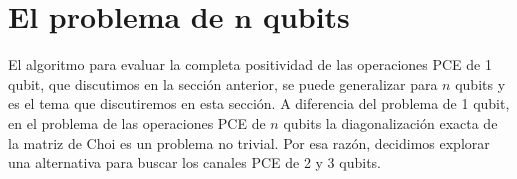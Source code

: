 \section{El problema de $\mathbf{n}$  qubits} %
\label{sec:n_qubits_problem}

%

El algoritmo  para evaluar la completa positividad de las operaciones PCE de 1
qubit, que discutimos en la sección anterior, se puede generalizar para $n$
qubits y es 
el tema que discutiremos en esta sección. A diferencia 
del problema de 1 qubit, en el problema de las operaciones PCE de $n$ qubits
la diagonalización exacta de la matriz de Choi es un problema no trivial. 
Por esa razón, decidimos explorar una alternativa para buscar 
los canales PCE de 2 y 3 qubits.

